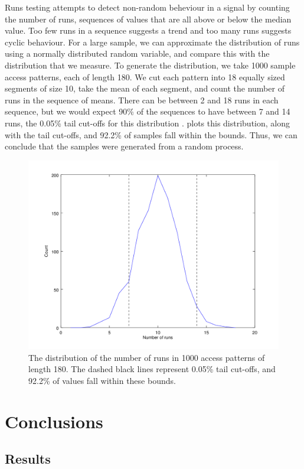 \documentclass[12pt,a4paper,twoside,openright]{report}
\begin{document}
Runs testing attempts to detect non-random beheviour in a signal by counting the number of runs, sequences of values that are all above or below the median value. Too few runs in a sequence suggests a trend and too many runs suggests cyclic behaviour. For a large sample, we can approximate the distribution of runs using a normally distributed random variable, and compare this with the distribution that we measure. To generate the distribution, we take 1000 sample access patterns, each of length 180. We cut each pattern into 18 equally sized segments of size 10, take the mean of each segment, and count the number of runs in the sequence of means. There can be between 2 and 18 runs in each sequence, but we would expect 90\% of the sequences to have between 7 and 14 runs, the 0.05\% tail cut-offs for this distribution \cite{masliah2000stationarity}.  plots this distribution, along with the tail cut-offs, and 92.2\% of samples fall within the bounds. Thus, we can conclude that the samples were generated from a random process.

\begin{figure}
    \centering
    \includegraphics[width=.8\linewidth]{runsTestPlot}
    \caption{The distribution of the number of runs in 1000 access patterns of length 180. The dashed black lines represent 0.05\% tail cut-offs, and 92.2\% of values fall within these bounds.}
    \label{fig:runsTestPlot}
\end{figure}

\chapter{Conclusions}

\section{Results}
\end{document}
